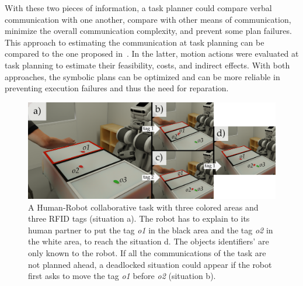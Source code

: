 With these two pieces of information, a task planner could compare verbal communication with one another, compare with other means of communication, minimize the overall communication complexity, and prevent some plan failures. This approach to estimating the communication at task planning can be compared to the one proposed in~\cite{lallement_2016_symbolic}. In the latter, motion actions were evaluated at task planning to estimate their feasibility, costs, and indirect effects. With both approaches, the symbolic plans can be optimized and can be more reliable in preventing execution failures and thus the need for reparation.


\begin{figure}[t!]
\centering
\includegraphics[width=\textwidth]{figures/chapter5/intro/intro.png}
\caption{\label{fig:chap5_intro} A Human-Robot collaborative task with three colored areas and three RFID tags (situation a). The robot has to explain to its human partner to put the tag \textit{o1} in the black area and the tag \textit{o2} in the white area, to reach the situation d. The objects identifiers' are only known to the robot.
If all the communications of the task are not planned ahead, a deadlocked situation could appear if the robot first asks to move the tag \textit{o1} before \textit{o2} (situation b).}
\end{figure}

